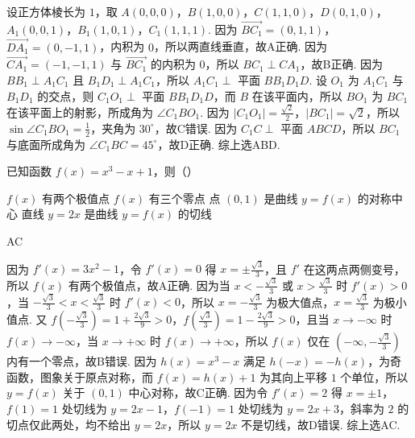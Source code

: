 \begin{solution}

设正方体棱长为 \(1\)，取 \(A(0,0,0)\)，\(B(1,0,0)\)，\(C(1,1,0)\)，\(D(0,1,0)\)，\(A_1(0,0,1)\)，\(B_1(1,0,1)\)，\(C_1(1,1,1)\). 因为 \(\overrightarrow{BC_1}=(0,1,1)\)，\(\overrightarrow{DA_1}=(0,-1,1)\)，内积为 \(0\)，所以两直线垂直，故A正确. 因为 \(\overrightarrow{CA_1}=(-1,-1,1)\) 与 \(\overrightarrow{BC_1}\) 的内积为 \(0\)，所以 \(BC_1\perp CA_1\)，故B正确. 因为 \(BB_1\perp A_1C_1\) 且 \(B_1D_1\perp A_1C_1\)，所以 \(A_1C_1\perp\) 平面 \(BB_1D_1D\). 设 \(O_1\) 为 \(A_1C_1\) 与 \(B_1D_1\) 的交点，则 \(C_1O_1\perp\) 平面 \(BB_1D_1D\)，而 \(B\) 在该平面内，所以 \(BO_1\) 为 \(BC_1\) 在该平面上的射影，所成角为 \(\angle C_1BO_1\). 因为 \(\lvert C_1O_1\rvert=\frac{\sqrt{2}}{2}\)，\(\lvert BC_1\rvert=\sqrt{2}\)，所以 \(\sin\angle C_1BO_1=\frac{1}{2}\)，夹角为 \(30^\circ\)，故C错误. 因为 \(C_1C\perp\) 平面 \(ABCD\)，所以 \(BC_1\) 与底面所成角为 \(\angle C_1BC=45^\circ\)，故D正确. 综上选ABD.
\end{solution}

\begin{problem}
已知函数 \(f(x)=x^3-x+1\)，则（\quad）

\choices
    {\(f(x)\) 有两个极值点}
    {\(f(x)\) 有三个零点}
    {点 \((0,1)\) 是曲线 \(y=f(x)\) 的对称中心}
    {直线 \(y=2x\) 是曲线 \(y=f(x)\) 的切线}
\end{problem}

\begin{answer}
AC
\end{answer}

\begin{solution}
因为 \(f'(x)=3x^2-1\)，令 \(f'(x)=0\) 得 \(x=\pm\frac{\sqrt{3}}{3}\)，且 \(f'\) 在这两点两侧变号，所以 \(f(x)\) 有两个极值点，故A正确. 因为当 \(x<-\frac{\sqrt{3}}{3}\) 或 \(x>\frac{\sqrt{3}}{3}\) 时 \(f'(x)>0\)，当 \(-\frac{\sqrt{3}}{3}<x<\frac{\sqrt{3}}{3}\) 时 \(f'(x)<0\)，所以 \(x=-\frac{\sqrt{3}}{3}\) 为极大值点，\(x=\frac{\sqrt{3}}{3}\) 为极小值点. 又 \(f\left(-\frac{\sqrt{3}}{3}\right)=1+\frac{2\sqrt{3}}{9}>0\)，\(f\left(\frac{\sqrt{3}}{3}\right)=1-\frac{2\sqrt{3}}{9}>0\)，且当 \(x\to -\infty\) 时 \(f(x)\to -\infty\)，当 \(x\to +\infty\) 时 \(f(x)\to +\infty\)，所以 \(f(x)\) 仅在 \(\left(-\infty,-\frac{\sqrt{3}}{3}\right)\) 内有一个零点，故B错误. 因为 \(h(x)=x^3-x\) 满足 \(h(-x)=-h(x)\)，为奇函数，图象关于原点对称，而 \(f(x)=h(x)+1\) 为其向上平移 \(1\) 个单位，所以 \(y=f(x)\) 关于 \((0,1)\) 中心对称，故C正确. 因为令 \(f'(x)=2\) 得 \(x=\pm 1\)，\(f(1)=1\) 处切线为 \(y=2x-1\)，\(f(-1)=1\) 处切线为 \(y=2x+3\)，斜率为 \(2\) 的切点仅此两处，均不给出 \(y=2x\)，所以 \(y=2x\) 不是切线，故D错误. 综上选AC.
\end{solution}

